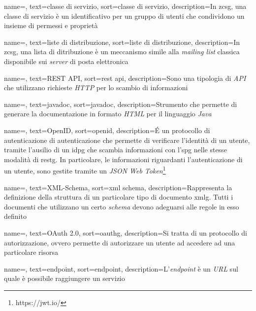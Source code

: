 {
    name=,
    text=classe di servizio,
    sort=classe di servizio,
    description={In \gls{zcsg}, una classe di servizio è un identificativo per un gruppo di utenti che condividono un insieme di permessi e proprietà}
}

{
    name=,
    text=liste di distribuzione,
    sort=liste di distribuzione,
    description={In \gls{zcsg}, una lista di ditribuzione è un meccanismo simile alla \textit{mailing list} classica disponibile sui \textit{server} di posta elettronica}
}

{
    name=,
    text=REST API,
    sort=rest api,
    description={Sono una tipologia di \textit{API} che utilizzano richieste \textit{HTTP} per lo scambio di informazioni}
}

{
    name=,
    text=javadoc,
    sort=javadoc,
    description={Strumento che permette di generare la documentazione in formato \textit{HTML} per il linguaggio \textit{Java}}
}

{
    name=,
    text=OpenID,
    sort=openid,
    description={\'E un protocollo di autenticazione di autenticazione che permette di verificare l'identità di un utente, tramite l'ausilio di un \gls{idpg} che scambia informazioni con l'\gls{spg} nelle stesse modalità di \gls{restg}. In particolare, le informazioni riguardanti l'autenticazione di un utente, sono gestite tramite un \textit{JSON Web Token}\footnote{https://jwt.io/}}
}

{
    name=,
    text=XML-Schema,
    sort=xml schema,
    description={Rappresenta la definizione della struttura di un particolare tipo di documento \gls{xmlg}. Tutti i documenti che utilizzano un certo \textit{schema} devono adeguarsi alle regole in esso definito}
}

{
    name=,
    text=OAuth 2.0,
    sort=oauthg,
    description={Si tratta di un protocollo di autorizzazione, ovvero permette di autorizzare un utente ad accedere ad una particolare risorsa}
}

{
    name=,
    text=endpoint,
    sort=endpoint,
    description={L'\textit{endpoint} è un \textit{URL} sul quale è possibile raggiungere un servizio}
}

